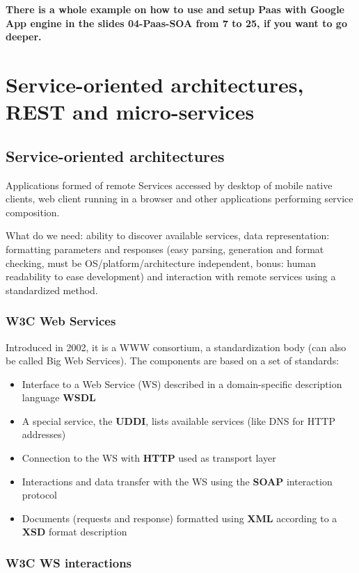 \textbf{There is a whole example on how to use and setup Paas with Google App engine in the slides 04-Paas-SOA from 7 to 25, if you want to go deeper.}

\section{Service-oriented architectures, REST and micro-services}

\subsection{Service-oriented architectures}

Applications formed of remote Services accessed by desktop of mobile native clients, web client running in a browser and other applications performing service composition.

What do we need: ability to discover available services, data representation: formatting parameters and responses (easy parsing, generation and format checking, must be OS/platform/architecture independent, bonus: human readability to ease development) and interaction with remote services using a standardized method.

\subsubsection*{W3C Web Services}

Introduced in 2002, it is a WWW consortium, a standardization body (can also be called Big Web Services). The components are based on a set of standards:
\begin{itemize}
    \item Interface to a Web Service (WS) described in a domain-specific description language \textbf{WSDL}
    \item A special service, the \textbf{UDDI}, lists available services (like DNS for HTTP addresses)
    \item Connection to the WS with \textbf{HTTP} used as transport layer
    \item Interactions and data transfer with the WS using the \textbf{SOAP} interaction protocol
    \item Documents (requests and response) formatted using \textbf{XML} according to a \textbf{XSD} format description
\end{itemize}

\subsubsection*{W3C WS interactions}

